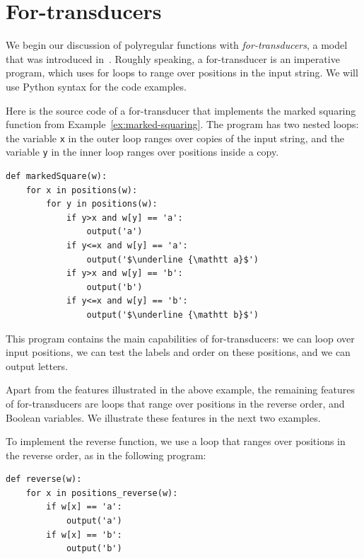 \section{For-transducers}
\label{sec:for-transducers}
We begin our discussion of polyregular functions with  \emph{for-transducers}, a model that was introduced in~\cite[Section 3]{bojanczykPolyregularFunctions2018}. Roughly speaking, a for-transducer is an imperative program, which uses for loops to range over positions in the input string.  We will use Python syntax for the code examples.


\begin{myexample}
  \label{ex:marked-squaring-for-transducer}
  Here is the source code of a for-transducer that implements the marked squaring function from Example~\ref{ex:marked-squaring}. The program has two nested loops: the variable {\tt x} in the outer loop ranges over copies of the input string, and the variable {\tt y} in the inner loop ranges over positions inside a copy. 
  \begin{lstlisting}
def markedSquare(w):
    for x in positions(w):
        for y in positions(w):
            if y>x and w[y] == 'a':
                output('a')
            if y<=x and w[y] == 'a':
                output('$\underline {\mathtt a}$')
            if y>x and w[y] == 'b':
                output('b')
            if y<=x and w[y] == 'b':
                output('$\underline {\mathtt b}$')
\end{lstlisting}
This program contains the main capabilities of for-transducers: we can loop over input positions, we can test the labels and order on these positions, and we can output letters.
\end{myexample}

Apart from the features illustrated in the above example, the remaining features of for-transducers are loops that range over positions in the reverse order, and Boolean variables. We illustrate these features in the next two examples.

\begin{myexample}[Reverse]\label{ex:reverse-for-transducer}
  To implement the reverse function, we use a loop that ranges over positions in the reverse order, as in the following program:
  \begin{lstlisting}
def reverse(w):
    for x in positions_reverse(w):  
        if w[x] == 'a':
            output('a')
        if w[x] == 'b':
            output('b')
\end{lstlisting}
\end{myexample}

